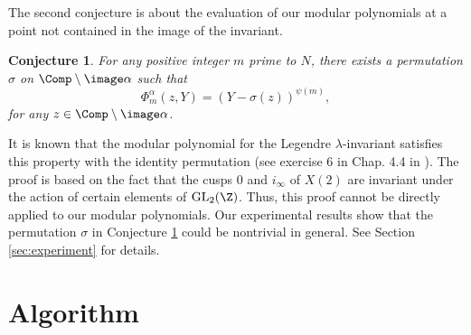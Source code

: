 \documentclass{amsart}
\newtheorem{conjecture}[theorem]{Conjecture}
\theoremstyle{definition}
\theoremstyle{remark}
\numberwithin{equation}{section}
\begin{document}
The second conjecture is about the evaluation of our modular polynomials
at a point not contained in the image of the invariant.
\begin{conjecture}\label{conj:evaluation_at_non_image}
    For any positive integer $m$ prime to $N$,
    there exists a permutation $\sigma$ on $\Comp\setminus\image \alpha$
    such that
    \begin{equation*}
        \Phi_m^{\alpha}(z, Y) = (Y - \sigma(z))^{\psi(m)},
    \end{equation*}
    for any $z \in \Comp\setminus\image \alpha$.
\end{conjecture}
It is known that
the modular polynomial for the Legendre $\lambda$-invariant
satisfies this property with the identity permutation
(see exercise 6 in Chap. 4.4 in \cite{PiAGM}).
The proof is based on the fact that the cusps $0$ and $i_\infty$ of $X(2)$
are invariant under the action of certain elements of $\operatorname{GL}_2(\Z)$.
Thus, this proof cannot be directly applied to our modular polynomials.
Our experimental results show that
the permutation $\sigma$ in Conjecture \ref{conj:evaluation_at_non_image}
could be nontrivial in general.
See Section \ref{sec:experiment} for details.

\section{Algorithm}\label{sec:algorithms}


\end{document}
